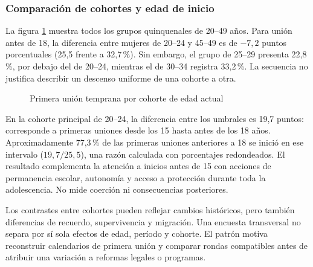 \subsubsection{Comparación de cohortes y edad de inicio}
La figura \ref{fig:union_cohortes} muestra todos los grupos quinquenales de
20--49 años. Para unión antes de 18, la diferencia entre mujeres de 20--24 y
45--49 es de $-7{,}2$ puntos porcentuales (25,5 frente a 32,7\,\%). Sin
embargo, el grupo de 25--29 presenta 22,8\,\%, por debajo del de 20--24,
mientras el de 30--34 registra 33,2\,\%. La secuencia no justifica describir
un descenso uniforme de una cohorte a otra.

\begin{figure}[htbp]\centering
{}
\caption{Primera unión temprana por cohorte de edad actual}\label{fig:union_cohortes}
\end{figure}

En la cohorte principal de 20--24, la diferencia entre los umbrales es 19,7
puntos: corresponde a primeras uniones desde los 15 hasta antes de los 18
años. Aproximadamente 77,3\,\% de las primeras uniones anteriores a 18 se
inició en ese intervalo ($19{,}7/25{,}5$), una razón calculada con porcentajes
redondeados. El resultado complementa la atención a inicios antes de 15 con
acciones de permanencia escolar, autonomía y acceso a protección durante
toda la adolescencia. No mide coerción ni consecuencias posteriores.

Los contrastes entre cohortes pueden reflejar cambios históricos, pero
también diferencias de recuerdo, supervivencia y migración. Una encuesta
transversal no separa por sí sola efectos de edad, período y cohorte. El
patrón motiva reconstruir calendarios de primera unión y comparar rondas
compatibles antes de atribuir una variación a reformas legales o programas.

